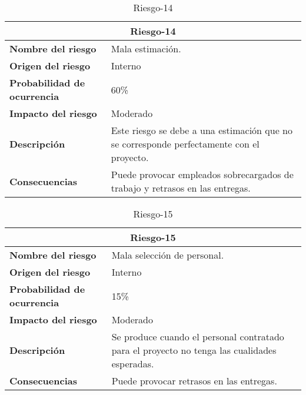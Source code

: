 \begin{table}[H]
\begin{center}
\begin{tabular}{p{} p{7cm}}
\multicolumn{2}{c}{\textbf{Riesgo-14} } \\
\hline \hline
\textbf{Nombre del riesgo} & Mala estimación. \\
\hline
\textbf{Origen del riesgo} & Interno\\
\hline
\textbf{Probabilidad de ocurrencia} &60\%\\
\hline
\textbf{Impacto del riesgo} &  Moderado \\
\hline
\textbf{Descripción} & Este riesgo se debe a una estimación que no se corresponde perfectamente con el proyecto.  \\
\hline
\textbf{Consecuencias} & Puede provocar empleados sobrecargados de trabajo y retrasos en las entregas.  \\
\hline
\end{tabular}
\caption{Riesgo-14}
\label{tab:Riesgo-14}
\end{center}
\end{table}

\begin{table}[H]
\begin{center}
\begin{tabular}{p{} p{7cm}}
\multicolumn{2}{c}{\textbf{Riesgo-15} } \\
\hline \hline
\textbf{Nombre del riesgo} & Mala selección de personal. \\
\hline
\textbf{Origen del riesgo} & Interno\\
\hline
\textbf{Probabilidad de ocurrencia} & 15\%  \\
\hline
\textbf{Impacto del riesgo} &  Moderado \\
\hline
\textbf{Descripción} &  Se produce cuando el personal contratado para el proyecto no tenga las cualidades esperadas. \\
\hline
\textbf{Consecuencias} & Puede provocar retrasos en las entregas.  \\
\hline
\end{tabular}
\caption{Riesgo-15}
\label{tab:Riesgo-15}
\end{center}
\end{table}

